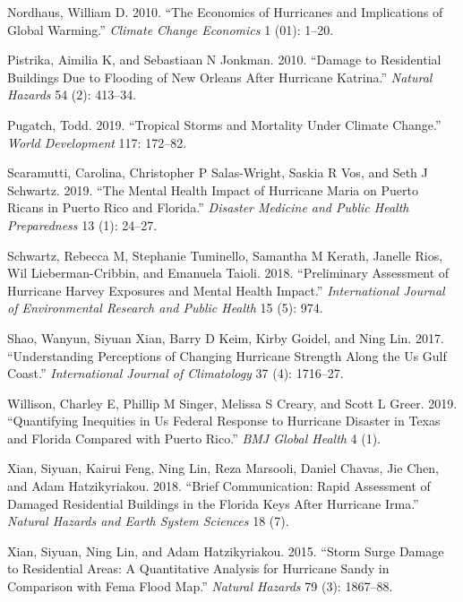 \documentclass[
]{article}
\begin{document}
\leavevmode\hypertarget{ref-nordhaus2010economics}{}%
Nordhaus, William D. 2010. ``The Economics of Hurricanes and
Implications of Global Warming.'' \emph{Climate Change Economics} 1
(01): 1--20.

\leavevmode\hypertarget{ref-pistrika2010damage}{}%
Pistrika, Aimilia K, and Sebastiaan N Jonkman. 2010. ``Damage to
Residential Buildings Due to Flooding of New Orleans After Hurricane
Katrina.'' \emph{Natural Hazards} 54 (2): 413--34.

\leavevmode\hypertarget{ref-pugatch2019tropical}{}%
Pugatch, Todd. 2019. ``Tropical Storms and Mortality Under Climate
Change.'' \emph{World Development} 117: 172--82.

\leavevmode\hypertarget{ref-scaramutti2019mental}{}%
Scaramutti, Carolina, Christopher P Salas-Wright, Saskia R Vos, and Seth
J Schwartz. 2019. ``The Mental Health Impact of Hurricane Maria on
Puerto Ricans in Puerto Rico and Florida.'' \emph{Disaster Medicine and
Public Health Preparedness} 13 (1): 24--27.

\leavevmode\hypertarget{ref-schwartz2018preliminary}{}%
Schwartz, Rebecca M, Stephanie Tuminello, Samantha M Kerath, Janelle
Rios, Wil Lieberman-Cribbin, and Emanuela Taioli. 2018. ``Preliminary
Assessment of Hurricane Harvey Exposures and Mental Health Impact.''
\emph{International Journal of Environmental Research and Public Health}
15 (5): 974.

\leavevmode\hypertarget{ref-shao2017understanding}{}%
Shao, Wanyun, Siyuan Xian, Barry D Keim, Kirby Goidel, and Ning Lin.
2017. ``Understanding Perceptions of Changing Hurricane Strength Along
the Us Gulf Coast.'' \emph{International Journal of Climatology} 37 (4):
1716--27.

\leavevmode\hypertarget{ref-willison2019quantifying}{}%
Willison, Charley E, Phillip M Singer, Melissa S Creary, and Scott L
Greer. 2019. ``Quantifying Inequities in Us Federal Response to
Hurricane Disaster in Texas and Florida Compared with Puerto Rico.''
\emph{BMJ Global Health} 4 (1).

\leavevmode\hypertarget{ref-xian2018brief}{}%
Xian, Siyuan, Kairui Feng, Ning Lin, Reza Marsooli, Daniel Chavas, Jie
Chen, and Adam Hatzikyriakou. 2018. ``Brief Communication: Rapid
Assessment of Damaged Residential Buildings in the Florida Keys After
Hurricane Irma.'' \emph{Natural Hazards and Earth System Sciences} 18
(7).

\leavevmode\hypertarget{ref-xian2015storm}{}%
Xian, Siyuan, Ning Lin, and Adam Hatzikyriakou. 2015. ``Storm Surge
Damage to Residential Areas: A Quantitative Analysis for Hurricane Sandy
in Comparison with Fema Flood Map.'' \emph{Natural Hazards} 79 (3):
1867--88.
\end{document}
